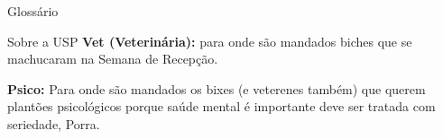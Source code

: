 \begin{secao}{Glossário}
\begin{subsecao}{Sobre a USP}
{\bf Vet (Veterinária):} para onde são mandados biches que se machucaram na Semana de Recepção.

{\bf Psico:} Para onde são mandados os bixes (e veterenes também) que querem plantões psicológicos porque saúde mental é importante deve ser tratada com seriedade, Porra.

\end{subsecao}
\end{secao}
